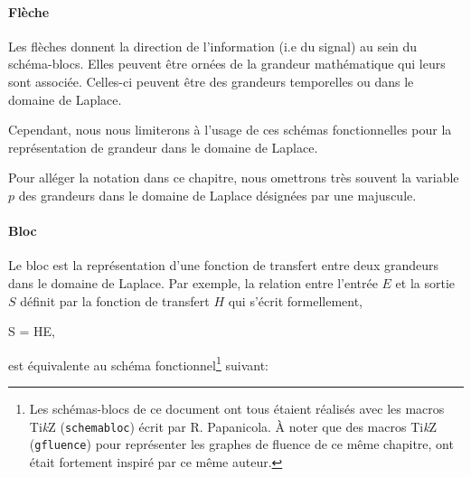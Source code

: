 \paragraph{Flèche}
Les flèches donnent la direction de l'information (i.e du signal) au sein du schéma-blocs. 
Elles peuvent être ornées de la grandeur mathématique qui leurs sont associée. 
Celles-ci peuvent être des grandeurs temporelles ou dans le domaine de Laplace. 
\begin{center}
\end{center}
Cependant, nous nous limiterons à l'usage de ces schémas fonctionnelles pour la représentation
de grandeur dans le domaine de Laplace.

Pour alléger la notation dans ce chapitre, nous omettrons 
très souvent la variable $p$ des grandeurs dans le domaine de Laplace désignées par une majuscule.

\newpage
\paragraph{Bloc}

Le bloc est la représentation d'une fonction de transfert entre deux grandeurs dans le domaine de Laplace.
Par exemple, la relation entre l'entrée $E$ et la sortie $S$ définit par la fonction de transfert $H$
qui s'écrit formellement, 
\begin{bequation}
S = HE,\label{eq-ES}
\end{bequation}
est équivalente au schéma fonctionnel\footnote{Les schémas-blocs de ce document ont tous 
étaient réalisés avec les macros Ti\emph{k}Z (\verb?schemabloc?) écrit par R. Papanicola\cite{schemabloc}. 
\`A noter que des macros Ti\emph{k}Z (\verb?gfluence?) pour représenter les graphes de fluence 
de ce même chapitre, ont était fortement inspiré par ce même auteur.} 
suivant:

\begin{center}
\end{center}


